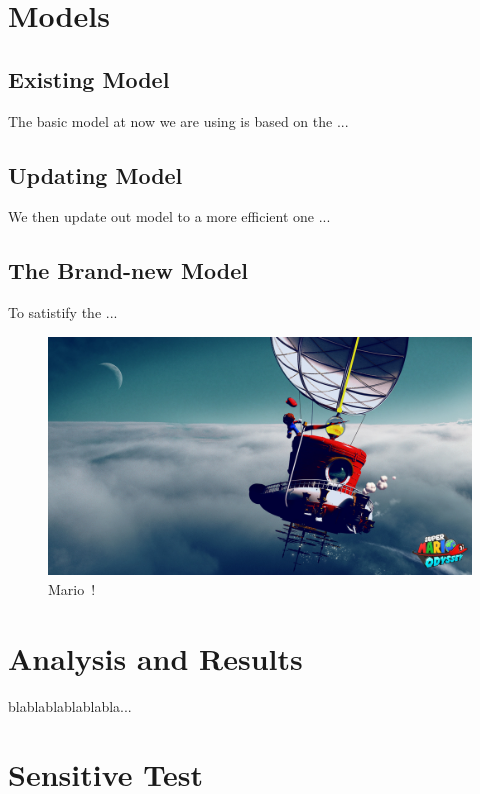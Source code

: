 \documentclass{mcmthesis}
\begin{document}
\section{Models}
  \subsection{Existing Model}
    The basic model at now we are using is based on the ...

  \subsection{Updating Model}
    We then update out model to a more efficient one ...

  \subsection{The Brand-new Model}
    To satistify the ...
    \\
    \begin{figure}[ht]

      \centering
      \includegraphics[scale=0.22]{pictures}
      \caption{Mario~!}
      \label{fig:label}

    \end{figure}


\section{Analysis and Results}

blablablablablabla...

\section{Sensitive Test}
\end{document}
